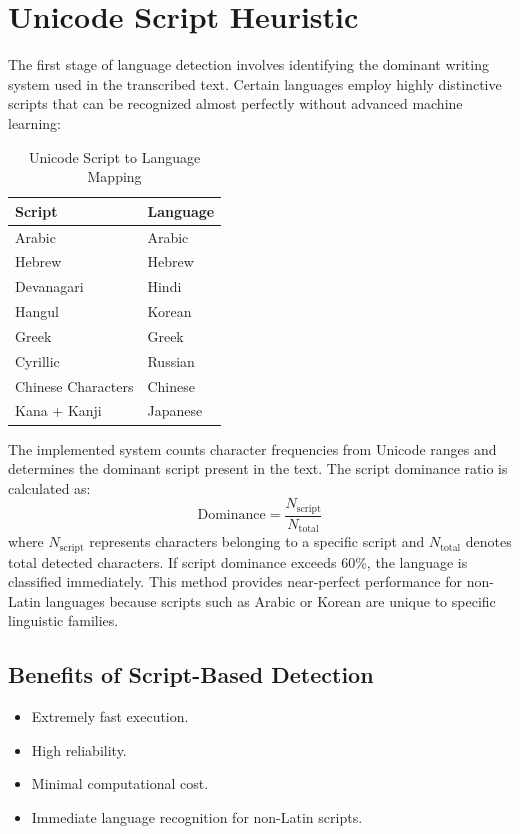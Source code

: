 \documentclass[12pt]{report}
\begin{document}
\section{Unicode Script Heuristic}

The first stage of language detection involves identifying the dominant writing system used in the transcribed text. Certain languages employ highly distinctive scripts that can be recognized almost perfectly without advanced machine learning:

\begin{table}[H]
\centering
\begin{tabular}{|l|l|}
\hline
\textbf{Script} & \textbf{Language} \\
\hline
Arabic & Arabic \\
\hline
Hebrew & Hebrew \\
\hline
Devanagari & Hindi \\
\hline
Hangul & Korean \\
\hline
Greek & Greek \\
\hline
Cyrillic & Russian \\
\hline
Chinese Characters & Chinese \\
\hline
Kana + Kanji & Japanese \\
\hline
\end{tabular}
\caption{Unicode Script to Language Mapping}
\end{table}

The implemented system counts character frequencies from Unicode ranges and determines the dominant script present in the text. The script dominance ratio is calculated as:
\[
\text{Dominance} = \frac{N_{\text{script}}}{N_{\text{total}}}
\]
where $N_{\text{script}}$ represents characters belonging to a specific script and $N_{\text{total}}$ denotes total detected characters. If script dominance exceeds 60\%, the language is classified immediately. This method provides near-perfect performance for non-Latin languages because scripts such as Arabic or Korean are unique to specific linguistic families.

\subsection{Benefits of Script-Based Detection}
\begin{itemize}
    \item Extremely fast execution.
    \item High reliability.
    \item Minimal computational cost.
    \item Immediate language recognition for non-Latin scripts.
\end{itemize}
\end{document}

